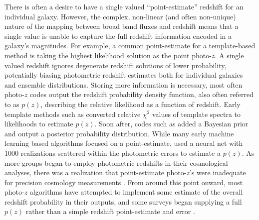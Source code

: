 There is often a desire to have a single valued ``point-estimate'' redshift for an individual galaxy.  However, the complex, non-linear (and often non-unique) nature of the mapping between broad band fluxes and redshift means that a single value is unable to capture the full redshift information encoded in a galaxy's magnitudes.  For example, a common point-estimate for a template-based method is taking the highest likelihood solution as the point photo-$z$.  A single valued redshift ignores degenerate redshift solutions of lower probability, potentially biasing photometric redshift estimates both for individual galaxies and ensemble distributions.  Storing more information is necessary, most often photo-$z$ codes output the redshift probability density function, also often referred to as $p(z)$, describing the relative likelihood as a function of redshift. %
Early template methods such as \citet{Fernandezsoto:99} converted relative $\chi^2$ values of template spectra to likelihoods to estimate $p(z)$.
Soon after, codes such as \citet{Benitez:00} added a Bayesian prior and output a posterior probability distribution.
While many early machine learning based algorithms focused on a point-estimate, \citet{Firth:03} used a neural net with 1000 realizations scattered within the photometric errors to estimate a $p(z)$.
As more groups began to employ photometric redshifts in their cosmological analyses, there was a realization that point-estimate photo-$z$'s were inadequate for precision cosmology measurements \citep{Mandelbaum:2008}.
From around this point onward, most photo-$z$ algorithms have attempted to implement some estimate of the overall redshift probability in their outputs, and some surveys began supplying a full $p(z)$ rather than a simple redshift point-estimate and error \citep[e.~g.~][]{de_Jong:17}.

